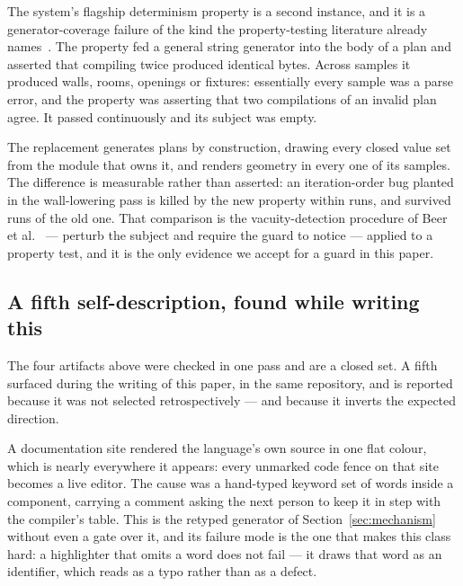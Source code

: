 \documentclass[10pt,journal,compsoc]{IEEEtran}
\begin{document}
The system's flagship determinism property is a second instance, and it is a generator-coverage
failure of the kind the property-testing literature already
names~\cite{groce2012swarm,goldstein2021judgecover}. The property fed a general string generator
into the body of a plan and asserted that compiling twice produced identical bytes. Across
\factOldPropSamples{} samples it produced \factOldPropGeometry{} walls, rooms, openings or
fixtures: essentially every sample was a parse error, and the property was asserting that two
compilations of an invalid plan agree. It passed continuously and its subject was empty.

The replacement generates plans by construction, drawing every closed value set from the module
that owns it, and renders geometry in every one of its \factNewPropSamples{} samples. The
difference is measurable rather than asserted: an iteration-order bug planted in the wall-lowering
pass is killed by the new property within \factPlantKilledRuns{} runs, and survived
\factPlantSurvivedRuns{} runs of the old one. That comparison is the vacuity-detection procedure
of Beer et al.~\cite{beer1997vacuity} --- perturb the subject and require the guard to
notice --- applied to a property test, and it is the only evidence we accept for a guard in this
paper.

\subsection{A fifth self-description, found while writing this}\label{sec:fifth}

The four artifacts above were checked in one pass and are a closed set. A fifth surfaced during
the writing of this paper, in the same repository, and is reported because it was not selected
retrospectively --- and because it inverts the expected direction.

A documentation site rendered the language's own source in one flat colour, which is nearly
everywhere it appears: every unmarked code fence on that site becomes a live editor. The cause was
a hand-typed keyword set of \factHandTypedWords{} words inside a component, carrying a comment
asking the next person to keep it in step with the compiler's table. This is the retyped generator
of Section~\ref{sec:mechanism} without even a gate over it, and its failure mode is the one that
makes this class hard: a highlighter that omits a word does not fail --- it draws that word as an
identifier, which reads as a typo rather than as a defect.
\end{document}
